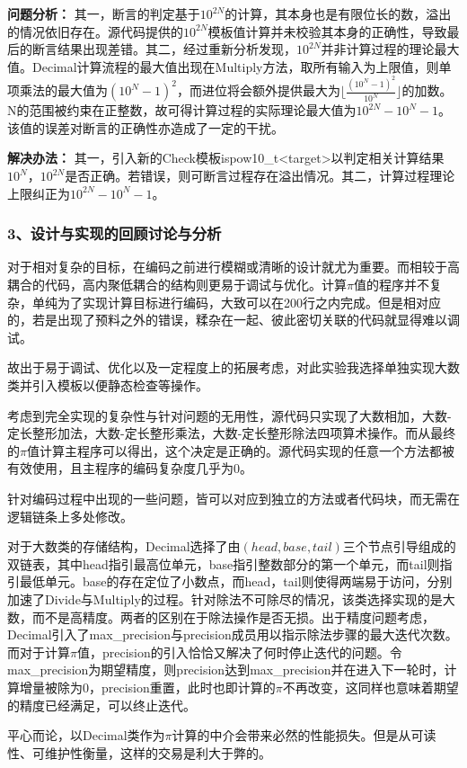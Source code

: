\documentclass[UTF8, a4paper]{ctexart}
\begin{document}
\textbf{问题分析：} 其一，断言的判定基于$10^{2N}$的计算，其本身也是有限位长的数，溢出的情况依旧存在。源代码提供的$10^{2N}$模板值计算并未校验其本身的正确性，导致最后的断言结果出现差错。其二，经过重新分析发现，$10^{2N}$并非计算过程的理论最大值。Decimal计算流程的最大值出现在Multiply方法，取所有输入为上限值，则单项乘法的最大值为$(10^N-1)^2$，而进位将会额外提供最大为$\lfloor\frac{(10^N-1)^2}{10^N}\rfloor$的加数。N的范围被约束在正整数，故可得计算过程的实际理论最大值为$10^{2N}-10^N-1$。该值的误差对断言的正确性亦造成了一定的干扰。 \par
\textbf{解决办法：} 其一，引入新的Check模板ispow10\_t<target>以判定相关计算结果$10^N$，$10^{2N}$是否正确。若错误，则可断言过程存在溢出情况。其二，计算过程理论上限纠正为$10^{2N}-10^N-1$。 \par

\subsubsection*{3、设计与实现的回顾讨论与分析}
对于相对复杂的目标，在编码之前进行模糊或清晰的设计就尤为重要。而相较于高耦合的代码，高内聚低耦合的结构则更易于调试与优化。计算$\pi$值的程序并不复杂，单纯为了实现计算目标进行编码，大致可以在200行之内完成。但是相对应的，若是出现了预料之外的错误，糅杂在一起、彼此密切关联的代码就显得难以调试。 \par
故出于易于调试、优化以及一定程度上的拓展考虑，对此实验我选择单独实现大数类并引入模板以便静态检查等操作。 \par
考虑到完全实现的复杂性与针对问题的无用性，源代码只实现了大数相加，大数-定长整形加法，大数-定长整形乘法，大数-定长整形除法四项算术操作。而从最终的$\pi$值计算主程序可以得出，这个决定是正确的。源代码实现的任意一个方法都被有效使用，且主程序的编码复杂度几乎为0。 \par
针对编码过程中出现的一些问题，皆可以对应到独立的方法或者代码块，而无需在逻辑链条上多处修改。 \par
对于大数类的存储结构，Decimal选择了由$(head,base,tail)$三个节点引导组成的双链表，其中head指引最高位单元，base指引整数部分的第一个单元，而tail则指引最低单元。base的存在定位了小数点，而head，tail则使得两端易于访问，分别加速了Divide与Multiply的过程。针对除法不可除尽的情况，该类选择实现的是大数，而不是高精度。两者的区别在于除法操作是否无损。出于精度问题考虑，Decimal引入了max\_precision与precision成员用以指示除法步骤的最大迭代次数。而对于计算$\pi$值，precision的引入恰恰又解决了何时停止迭代的问题。令max\_precision为期望精度，则precision达到max\_precision并在进入下一轮时，计算增量被除为0，precision重置，此时也即计算的$\pi$不再改变，这同样也意味着期望的精度已经满足，可以终止迭代。 \par
平心而论，以Decimal类作为$\pi$计算的中介会带来必然的性能损失。但是从可读性、可维护性衡量，这样的交易是利大于弊的。
\end{document}
